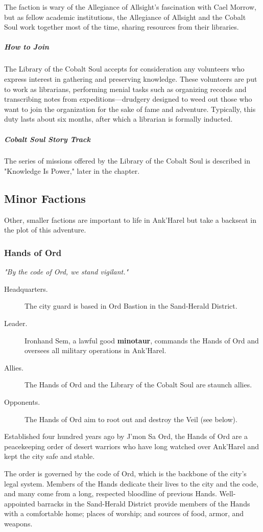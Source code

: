 \documentclass[10pt,a4paper,twoside,fancy,bg=print,twocolumn,openany,nodeprecatedcode]{dndbook}
\begin{document}
The faction is wary of the Allegiance of Allsight's fascination with Cael Morrow, but as fellow academic institutions, the Allegiance of Allsight and the Cobalt Soul work together most of the time, sharing resources from their libraries.

\subparagraph{How to Join}
The Library of the Cobalt Soul accepts for consideration any volunteers who express interest in gathering and preserving knowledge. These volunteers are put to work as librarians, performing menial tasks such as organizing records and transcribing notes from expeditions—drudgery designed to weed out those who want to join the organization for the sake of fame and adventure. Typically, this duty lasts about six months, after which a librarian is formally inducted.

\subparagraph{Cobalt Soul Story Track}
The series of missions offered by the Library of the Cobalt Soul is described in "Knowledge Is Power," later in the chapter.

\subsection{Minor Factions}
Other, smaller factions are important to life in Ank'Harel but take a backseat in the plot of this adventure.

\subsubsection{Hands of Ord}
\textit{"By the code of Ord, we stand vigilant."}


\begin{description}
\item[Headquarters.]
The city guard is based in Ord Bastion in the Sand-Herald District.
\item[Leader.]
Ironhand Sem, a lawful good \textbf{minotaur}, commands the Hands of Ord and oversees all military operations in Ank'Harel.
\item[Allies.]
The Hands of Ord and the Library of the Cobalt Soul are staunch allies.
\item[Opponents.]
The Hands of Ord aim to root out and destroy the Veil (see below).
\end{description}

Established four hundred years ago by J'mon Sa Ord, the Hands of Ord are a peacekeeping order of desert warriors who have long watched over Ank'Harel and kept the city safe and stable.

The order is governed by the code of Ord, which is the backbone of the city's legal system. Members of the Hands dedicate their lives to the city and the code, and many come from a long, respected bloodline of previous Hands. Well-appointed barracks in the Sand-Herald District provide members of the Hands with a comfortable home; places of worship; and sources of food, armor, and weapons.
\end{document}
